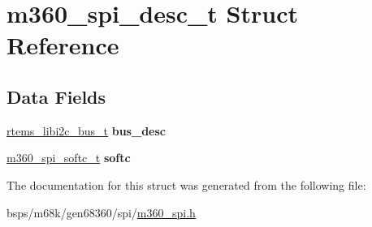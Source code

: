 \hypertarget{structm360__spi__desc__t}{}\section{m360\+\_\+spi\+\_\+desc\+\_\+t Struct Reference}
\label{structm360__spi__desc__t}
\subsection*{Data Fields}
\begin{DoxyCompactItemize}
\item 
\mbox{\label{structm360__spi__desc__t_a6f7510ce64a7907736cfb655b9217d6b}} 
\mbox{\hyperlink{structrtems__libi2c__bus__t__}{rtems\+\_\+libi2c\+\_\+bus\+\_\+t}} {\bfseries bus\+\_\+desc}
\item 
\mbox{\label{structm360__spi__desc__t_aac7ee521cd55e0793c00074c67d2b62d}} 
\mbox{\hyperlink{structm360__spi__softc}{m360\+\_\+spi\+\_\+softc\+\_\+t}} {\bfseries softc}
\end{DoxyCompactItemize}


The documentation for this struct was generated from the following file\+:\begin{DoxyCompactItemize}
\item 
bsps/m68k/gen68360/spi/\mbox{\hyperlink{m360__spi_8h}{m360\+\_\+spi.\+h}}\end{DoxyCompactItemize}
